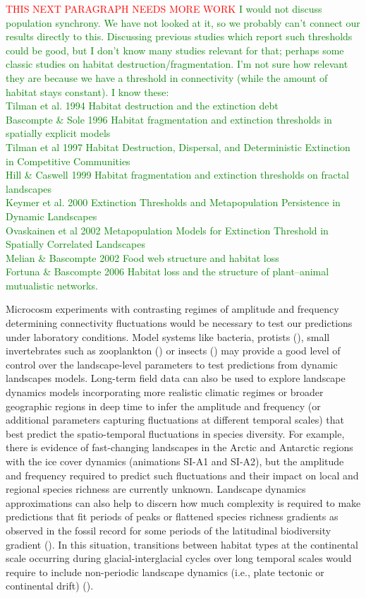 \documentclass[12pt]{article}
\newcommand{\carlos}[1]{\textcolor{Red}{#1}}
\newcommand{\JK}[1]{\textcolor{Green}{#1}}
\begin{document}
\carlos{THIS NEXT PARAGRAPH NEEDS MORE WORK} \JK{I would not discuss population synchrony. We have not looked at it, so we probably can't connect our results directly to this. Discussing previous studies which report such thresholds could be good, but I don't know many studies relevant for that; perhaps some classic studies on habitat destruction/fragmentation. I'm not sure how relevant they are because we have a threshold in connectivity (while the amount of habitat stays constant). I know these:\\
Tilman et al. 1994 Habitat destruction and the extinction debt\\
Bascompte \& Sole 1996 Habitat fragmentation and extinction thresholds in spatially explicit models\\
Tilman et al 1997 Habitat Destruction, Dispersal, and Deterministic Extinction in Competitive Communities\\
Hill \& Caswell 1999 Habitat fragmentation and extinction thresholds on fractal landscapes\\
Keymer et al. 2000 Extinction Thresholds and Metapopulation Persistence in Dynamic Landscapes\\
Ovaskainen et al 2002 Metapopulation Models for Extinction Threshold in Spatially Correlated Landscapes\\
Melian \& Bascompte 2002 Food web structure and habitat loss\\
Fortuna \& Bascompte 2006 Habitat loss and the structure of plant–animal mutualistic networks.}

Microcosm experiments with contrasting regimes of amplitude and frequency determining connectivity fluctuations would be necessary to test our predictions under laboratory conditions. Model systems like bacteria, protists (\cite{Carrara2012dendritic, AltermattEtAl2015}), small invertebrates such as zooplankton (\cite{Steiner2011seasonal_experiments}) or insects (\cite{GovindanSwihart2012}) may provide a good level of control over the landscape-level parameters to test predictions from dynamic landscapes models. Long-term field data can also be used to explore landscape dynamics models incorporating more realistic climatic regimes or broader geographic regions in deep time to infer the amplitude and frequency (or additional parameters capturing fluctuations at different temporal scales) that best predict the spatio-temporal fluctuations in species diversity. For example, there is evidence of fast-changing landscapes in the Arctic and Antarctic regions with the ice cover dynamics (animations SI-A1 and SI-A2), but the amplitude and frequency required to predict such fluctuations and their impact on local and regional species richness are currently unknown. Landscape dynamics approximations can also help to discern how much complexity is required to make predictions that fit periods of peaks or flattened species richness gradients as observed in the fossil record for some periods of the latitudinal biodiversity gradient (\cite{mannionetal2014}). In this situation, transitions between habitat types at the continental scale occurring during glacial-interglacial cycles over long temporal scales would require to include non-periodic landscape dynamics (i.e., plate tectonic or continental drift) (\cite{WerneckEtAl2011}).
 
\end{document}
